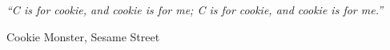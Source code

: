 \documentclass[11pt, a4paper, oneside]{Thesis} %
\begin{document}


%
%
%
%
%
%   
%


\pagestyle{empty} %

\null\vfill %

\textit{\large{``C is for cookie, and cookie is for me; C is for cookie, and cookie is for me.''}}

\begin{flushright}
Cookie Monster, Sesame Street
\end{flushright}

\vfill\vfill\vfill\vfill\vfill\vfill\null %

\clearpage %


\end{document}
